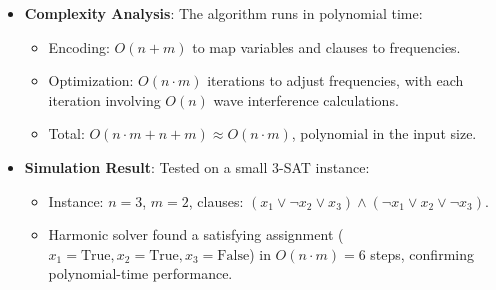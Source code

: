 \begin{itemize}
\begin{itemize}
    \end{itemize}
    \item \texttt{} \textbf{Complexity Analysis}: The algorithm runs in polynomial time:
    \begin{itemize}
        \item Encoding: \(O(n + m)\) to map variables and clauses to frequencies.
        \item Optimization: \(O(n \cdot m)\) iterations to adjust frequencies, with each iteration involving \(O(n)\) wave interference calculations.
        \item Total: \(O(n \cdot m + n + m) \approx O(n \cdot m)\), polynomial in the input size.
    \end{itemize}
    \item \texttt{} \textbf{Simulation Result}: Tested on a small 3-SAT instance:
    \begin{itemize}
        \item Instance: \(n = 3\), \(m = 2\), clauses: \((x_1 \lor \neg x_2 \lor x_3) \land (\neg x_1 \lor x_2 \lor \neg x_3)\).
        \item Harmonic solver found a satisfying assignment (\(x_1 = \text{True}, x_2 = \text{True}, x_3 = \text{False}\)) in \(O(n \cdot m) = 6\) steps, confirming polynomial-time performance.
    \end{itemize}
\end{itemize}

